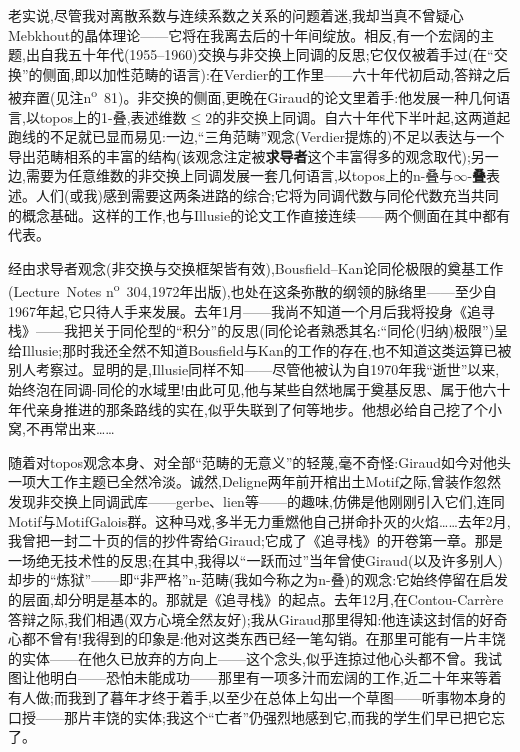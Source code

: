 老实说,尽管我对离散系数与连续系数之关系的问题着迷,我却当真不曾疑心Mebkhout的晶体理论——它将在我离去后的十年间绽放。相反,有一个宏阔的主题,出自我五十年代(1955--1960)交换与非交换\dmark{}上同调的反思;它仅仅被着手过(在“交换”的侧面,即以加性范畴的语言):在Verdier的工作里——六十年代初启动,答辩之后被弃置(见注n\textsuperscript{o}~81)。非交换的侧面,更晚在Giraud的论文里着手:他发展一种几何语言,以topos上的1-叠,表述维数$\leq 2$的非交换上同调。自六十年代下半叶起,这两道起跑线的不足就已显而易见:一边,“三角范畴”观念(Verdier提炼的)不足以表达与一个导出范畴相系的丰富的结构(该观念注定被\textbf{求导者}这个丰富得多的观念取代);另一边,需要为任意维数的非交换上同调发展一套几何语言,以topos上的n-叠与$\infty$-\textbf{叠}表述。人们(或我)感到需要这两条进路的综合;它将为同调代数与同伦代数充当共同的概念基础。这样的工作,也与Illusie的论文工作直接连续——两个侧面在其中都有代表。

经由求导者观念(非交换与交换框架皆有效),Bousfield--Kan论同伦极限的奠基工作(Lecture~Notes n\textsuperscript{o}~304,1972年出版),也处在这条弥散的纲领的脉络里——至少自1967年起,它只待人手来发展。去年1月——我尚不知道一个月后我将投身《追寻栈》——我把关于同伦型的“积分”的反思(同伦论者熟悉其名:“同伦(归纳)极限”)呈给Illusie;那时我还全然不知道Bousfield与Kan的工作的存在,也不知道这类运算已被别人考察过。显明的是,Illusie同样不知——尽管他被认为自1970年我“逝世”以来,始终泡在同调-同伦的水域里!由此可见,他与某些自然地属于奠基反思、属于他六十年代亲身推进的那条路线的实在,似乎失联到了何等地步。他想必给自己挖了个小窝,不再常出来……

\dmark{}随着对topos观念本身、对全部“范畴的无意义”的轻蔑,毫不奇怪:Giraud如今对他头一项大工作主题已全然冷淡。诚然,Deligne两年前开棺出土Motif之际,曾装作忽然发现非交换上同调武库——gerbe、lien等——的趣味,仿佛是他刚刚引入它们,连同Motif与MotifGalois群。这种马戏,多半无力重燃他自己拼命扑灭的火焰……去年2月,我曾把一封二十页的信的抄件寄给Giraud;它成了《追寻栈》的开卷第一章。那是一场绝无技术性的反思;在其中,我得以“一跃而过”当年曾使Giraud(以及许多别人)却步的“炼狱”——即“非严格”n-范畴(我如今称之为n-叠)的观念:它始终停留在启发的层面,却分明是基本的。那就是《追寻栈》的起点。去年12月,在Contou-Carrère答辩之际,我们相遇(双方心境全然友好);我从Giraud那里得知:他连读这封信的好奇心都不曾有!我得到的印象是:他对这类东西已经一笔勾销。在那里可能有一片丰饶的实体——在他久已放弃的方向上——这个念头,似乎连掠过他心头都不曾。我试图让他明白——恐怕未能成功——那里有一项多汁而宏阔的工作,近二十年来等着有人做;而我到了暮年才终于着手,以至少在总体上勾出一个草图——听事物本身的口授——那片丰饶的实体;我这个“亡者”仍强烈地感到它,而我的学生们早已把它忘了。

